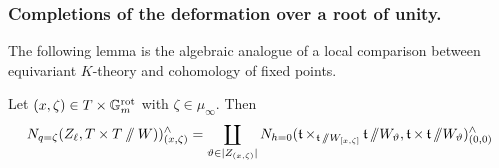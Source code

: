 \subsubsection{Completions of the deformation over a root of unity.}

The following lemma is the algebraic analogue of a local comparison between equivariant $K$-theory and cohomology of fixed points.

\begin{lemma}\label{lemma: completions of the deformation}
Let $(x, \zeta) \in T \times \mathbb{G}_m^{\mathrm{rot}}$ with $\zeta \in \mu_{\infty}$. Then
\begin{equation*}
    N_{q=\zeta}(Z_{\ell}, T \times T\sslash W))^{\wedge}_{(x, \zeta)} = \coprod_{\vartheta \in |Z_{(x, \zeta)}|} N_{h=0}(\operatorname{\mathfrak{t}} \times_{\operatorname{\mathfrak{t}} \sslash W_{[x, \zeta]}} \operatorname{\mathfrak{t}} \sslash W_{\vartheta}, \operatorname{\mathfrak{t}} \times \operatorname{\mathfrak{t}} \sslash W_{\vartheta})^{\wedge}_{(0, 0)}
\end{equation*}
\end{lemma}
